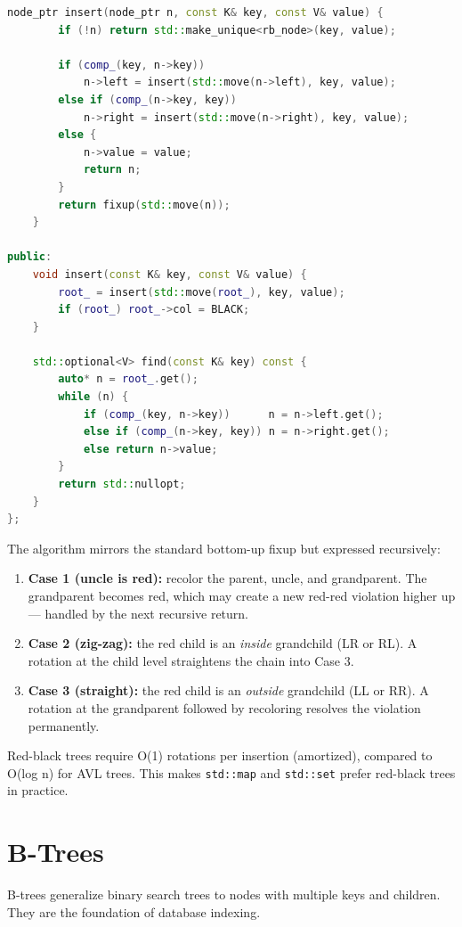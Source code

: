 \begin{lstlisting}[language=C++]
    node_ptr insert(node_ptr n, const K& key, const V& value) {
        if (!n) return std::make_unique<rb_node>(key, value);

        if (comp_(key, n->key))
            n->left = insert(std::move(n->left), key, value);
        else if (comp_(n->key, key))
            n->right = insert(std::move(n->right), key, value);
        else {
            n->value = value;
            return n;
        }
        return fixup(std::move(n));
    }

public:
    void insert(const K& key, const V& value) {
        root_ = insert(std::move(root_), key, value);
        if (root_) root_->col = BLACK;
    }

    std::optional<V> find(const K& key) const {
        auto* n = root_.get();
        while (n) {
            if (comp_(key, n->key))      n = n->left.get();
            else if (comp_(n->key, key)) n = n->right.get();
            else return n->value;
        }
        return std::nullopt;
    }
};
\end{lstlisting}

The algorithm mirrors the standard bottom-up fixup but expressed recursively:
\begin{enumerate}
\item \textbf{Case 1 (uncle is red):} recolor the parent, uncle, and grandparent. The grandparent becomes red, which may create a new red-red violation higher up — handled by the next recursive return.
\item \textbf{Case 2 (zig-zag):} the red child is an \textit{inside} grandchild (LR or RL). A rotation at the child level straightens the chain into Case 3.
\item \textbf{Case 3 (straight):} the red child is an \textit{outside} grandchild (LL or RR). A rotation at the grandparent followed by recoloring resolves the violation permanently.
\end{enumerate}

Red-black trees require O(1) rotations per insertion (amortized), compared to O(log n) for AVL trees. This makes \texttt{std::map} and \texttt{std::set} prefer red-black trees in practice.

\section{B-Trees}

B-trees generalize binary search trees to nodes with multiple keys and children. They are the foundation of database indexing.

